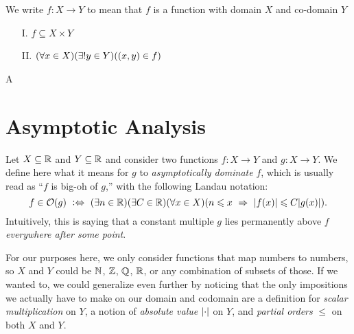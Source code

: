 \begin{definition}[Function]
    We write $f: X \to Y$ to mean that $f$ is a function with domain $X$ and co-domain $Y$ {\ifandonlyif}
    \begin{enumerate}
        \item[I.]
            $f \subseteq X \times Y$
        \item[II.]
            $\pn*{\forall x \in X}\pn*{\exists ! y \in Y}\pn*{(x, y) \in f}$
    \end{enumerate}
\end{definition}

\begin{definition}[List]
    A 
\end{definition}

\section{Asymptotic Analysis}
\begin{definition}
    Let $X \subseteq \mathbb{R}$ and $Y \subseteq \mathbb{R}$ and consider two functions $f: X \to Y$ and $g: X \to Y$.
    We define here what it means for $g$ to \emph{asymptotically dominate} $f$,
    which is usually read as ``$f$ is big-oh of $g$,''
    with the following Landau notation:
    \[
        f \in \O{g} \iffdefn \pn*{\exists n \in \R}\pn*{\exists C \in \R}\pn*{\forall x \in X}
                             \pn*{n \leq x \implies \abs{f(x)} \leq C \abs{g(x)}}.
    \]
    Intuitively, this is saying that a constant multiple $g$ lies permanently above $f$
    \emph{everywhere after some point}.

    For our purposes here, we only consider functions that map numbers to numbers,
    so $X$ and $Y$ could be $\mathbb{N}$, $\mathbb{Z}$, $\mathbb{Q}$, $\mathbb{R}$, or any combination of subsets of those.
    If we wanted to, we could generalize even further by noticing that
    the only impositions we actually have to make on our domain and codomain are
    a definition for \emph{scalar multiplication} on $Y$,
    a notion of \emph{absolute value} $\lvert\cdot\rvert$ on $Y$,
    and \emph{partial orders} $\leq$ on both $X$ and $Y$.
\end{definition}

